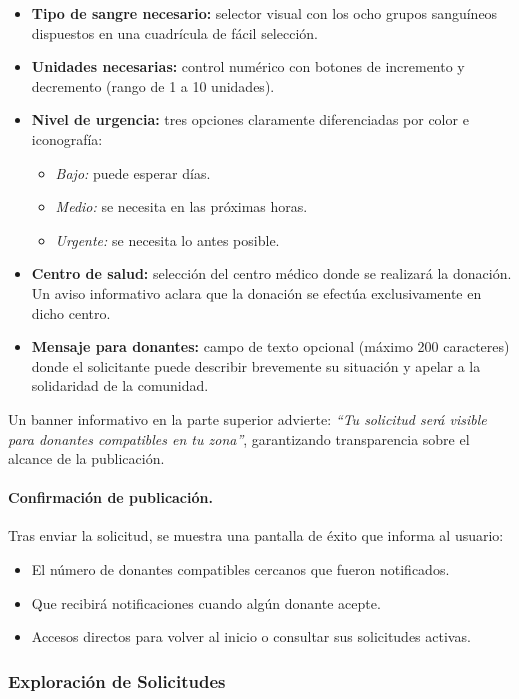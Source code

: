 \documentclass[12pt, a4paper]{article}
\begin{document}
\begin{itemize}
    \item \textbf{Tipo de sangre necesario:} selector visual con los ocho grupos sanguíneos dispuestos en una cuadrícula de fácil selección.
    \item \textbf{Unidades necesarias:} control numérico con botones de incremento y decremento (rango de 1 a 10 unidades).
    \item \textbf{Nivel de urgencia:} tres opciones claramente diferenciadas por color e iconografía:
    \begin{itemize}
        \item \textit{Bajo:} puede esperar días.
        \item \textit{Medio:} se necesita en las próximas horas.
        \item \textit{Urgente:} se necesita lo antes posible.
    \end{itemize}
    \item \textbf{Centro de salud:} selección del centro médico donde se realizará la donación. Un aviso informativo aclara que la donación se efectúa exclusivamente en dicho centro.
    \item \textbf{Mensaje para donantes:} campo de texto opcional (máximo 200 caracteres) donde el solicitante puede describir brevemente su situación y apelar a la solidaridad de la comunidad.
\end{itemize}

Un banner informativo en la parte superior advierte: \textit{``Tu solicitud será visible para donantes compatibles en tu zona''}, garantizando transparencia sobre el alcance de la publicación.

\paragraph{Confirmación de publicación.}
Tras enviar la solicitud, se muestra una pantalla de éxito que informa al usuario:
\begin{itemize}
    \item El número de donantes compatibles cercanos que fueron notificados.
    \item Que recibirá notificaciones cuando algún donante acepte.
    \item Accesos directos para volver al inicio o consultar sus solicitudes activas.
\end{itemize}

\subsubsection{Exploración de Solicitudes}
\end{document}

